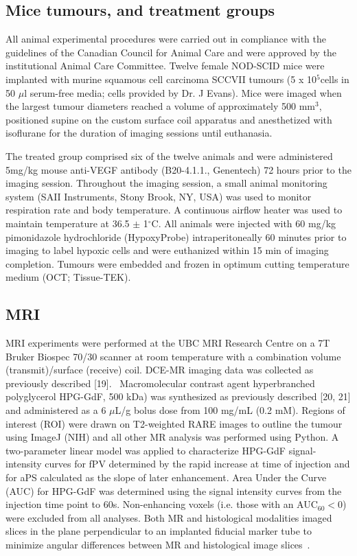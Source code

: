\subsection{Mice tumours, and treatment groups}

All animal experimental procedures were carried out in compliance with the guidelines of the Canadian Council for Animal Care and were approved by the institutional Animal Care Committee. 
Twelve female NOD-SCID mice were implanted with murine squamous cell carcinoma SCCVII tumours (5 x 10$^5 $cells in 50 $\mu$l serum-free media; cells provided by Dr. J Evans).
Mice were imaged when the largest tumour diameters reached a volume of approximately 500 mm$^3$, positioned supine on the custom surface coil apparatus and anesthetized with isoflurane for the duration of imaging sessions until euthanasia.

The treated group comprised six of the twelve animals and were administered 5mg/kg mouse anti-VEGF antibody (B20-4.1.1., Genentech) 72 hours prior to the imaging session.
Throughout the imaging session, a small animal monitoring system (SAII Instruments, Stony Brook, NY, USA) was used to monitor respiration rate and body temperature. 
A continuous airflow heater was used to maintain temperature at 36.5 $\pm$ 1$^\circ$C.
All animals were injected with 60 mg/kg pimonidazole hydrochloride (HypoxyProbe) intraperitoneally 60 minutes prior to imaging to label hypoxic cells and were euthanized within 15 min of imaging completion.
Tumours were embedded and frozen in optimum cutting temperature medium (OCT; Tissue-TEK).

\subsection{MRI}
MRI experiments were performed at the UBC MRI Research Centre on a 7T Bruker Biospec 70/30 scanner at room temperature with a combination volume (transmit)/surface (receive) coil.
DCE-MR imaging data was collected as previously described [19].~
Macromolecular contrast agent hyperbranched polyglycerol \acs{HPG-GdF}, 500 kDa) was synthesized as previously described [20, 21] and administered as a 6 $\mu$L/g bolus dose from 100 mg/mL (0.2 mM).
Regions of interest (ROI) were drawn on T2-weighted RARE images to outline the tumour using ImageJ (NIH) and all other MR analysis was performed using Python.
A two-parameter linear model was applied to characterize \acs{HPG-GdF} signal-intensity curves for \acs{fPV} determined by the rapid increase at time of injection and for \acs{aPS} calculated as the slope of later enhancement.
Area Under the Curve (\acs{AUC}) for \acs{HPG-GdF} was determined using the signal intensity curves from the injection time point to 60s.
Non-enhancing voxels (i.e. those with an AUC$_{60} < 0$) were excluded from all analyses.
Both MR and histological modalities imaged slices in the plane perpendicular to an implanted fiducial marker tube to minimize angular differences between MR and histological image slices~\cite{Bains:2009hh}.

